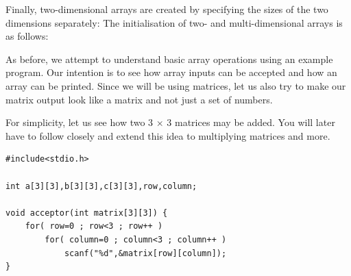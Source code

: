 \documentclass[11pt,oneside]{article}
\begin{document}
{{{{{{{{{Finally, two-dimensional arrays are created by specifying the sizes of the two dimensions separately:  The initialisation of two- and multi-dimensional arrays is as follows: 

As before, we attempt to understand basic array operations using an example program. Our intention is to see how array inputs can be accepted and how an array can be printed. Since we will be using matrices, let us also try to make our matrix output look like a matrix and not just a set of numbers.

For simplicity, let us see how two 3 $\times$ 3 matrices may be added. You will later have to follow closely and extend this idea to multiplying matrices and more.\\[1cm]
\begin{lstlisting}
#include<stdio.h>

int a[3][3],b[3][3],c[3][3],row,column;

void acceptor(int matrix[3][3]) {
    for( row=0 ; row<3 ; row++ )
        for( column=0 ; column<3 ; column++ )
            scanf("%d",&matrix[row][column]);
}


\end{lstlisting}}}}}}}}}}
\end{document}
